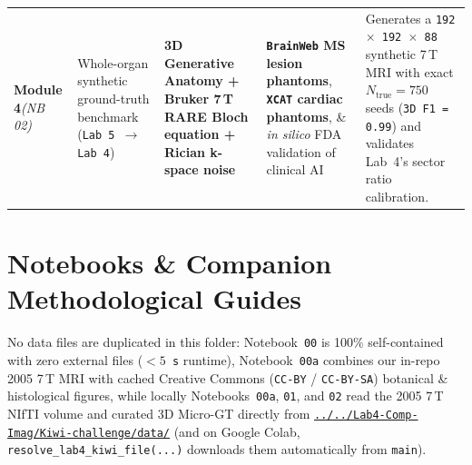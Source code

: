 \documentclass[10pt,a4paper]{article}
\newcommand{\ghtree}{https://github.com/arvidl/BMED365-2027/tree/main}
\begin{document}
{\begin{xltabular}{\textwidth}{L{1.85cm} L{3.3cm} L{3.55cm} L{3.7cm} Y}
\textbf{Module 4}\newline \textit{(NB 02)} &
Whole-organ synthetic ground-truth benchmark (\texttt{Lab 5 $\to$ Lab 4}) &
\textbf{3D Generative Anatomy + Bruker 7\,T RARE Bloch equation + Rician k-space noise} &
\textbf{\texttt{BrainWeb} MS lesion phantoms}, \textbf{\texttt{XCAT} cardiac phantoms}, \& \textit{in silico} FDA validation of clinical AI &
Generates a \texttt{192 $\times$ 192 $\times$ 88} synthetic 7\,T MRI with exact $N_{\text{true}} = 750$ seeds (\texttt{3D F1 = 0.99}) and validates Lab~4's sector ratio calibration. \\
\end{xltabular}
}

\section{Notebooks \& Companion Methodological Guides}

No data files are duplicated in this folder: Notebook~\texttt{00} is 100\% self-contained with zero external files (\texttt{$< 5$\,s} runtime), Notebook~\texttt{00a} combines our in-repo 2005 7\,T MRI with cached Creative Commons (\texttt{CC-BY} / \texttt{CC-BY-SA}) botanical \& histological figures, while locally Notebooks~\texttt{00a}, \texttt{01}, and \texttt{02} read the 2005 7\,T NIfTI volume and curated 3D Micro-GT directly from \href{\ghtree/Lab4-Comp-Imag/Kiwi-challenge/data}{\texttt{../../Lab4-Comp-Imag/Kiwi-challenge/data/}} (and on Google Colab, \texttt{resolve\_lab4\_kiwi\_file(...)} downloads them automatically from \texttt{main}).
\end{document}
